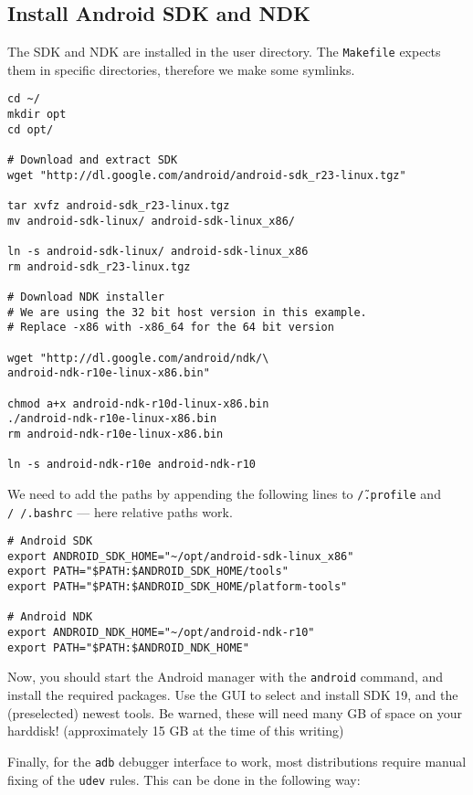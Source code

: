 \subsection{Install Android SDK and NDK}

The SDK and NDK are installed in the user directory. The \texttt{Makefile} expects them in specific directories, therefore we make some symlinks.

\begin{verbatim}
cd ~/
mkdir opt
cd opt/

# Download and extract SDK
wget "http://dl.google.com/android/android-sdk_r23-linux.tgz"

tar xvfz android-sdk_r23-linux.tgz
mv android-sdk-linux/ android-sdk-linux_x86/

ln -s android-sdk-linux/ android-sdk-linux_x86
rm android-sdk_r23-linux.tgz

# Download NDK installer
# We are using the 32 bit host version in this example.
# Replace -x86 with -x86_64 for the 64 bit version

wget "http://dl.google.com/android/ndk/\
android-ndk-r10e-linux-x86.bin"

chmod a+x android-ndk-r10d-linux-x86.bin
./android-ndk-r10e-linux-x86.bin
rm android-ndk-r10e-linux-x86.bin

ln -s android-ndk-r10e android-ndk-r10
\end{verbatim}

We need to add the paths by appending the following lines to \texttt{\~/.profile} and \texttt{/~/.bashrc} --- here relative paths work.

\begin{verbatim}
# Android SDK
export ANDROID_SDK_HOME="~/opt/android-sdk-linux_x86"
export PATH="$PATH:$ANDROID_SDK_HOME/tools"
export PATH="$PATH:$ANDROID_SDK_HOME/platform-tools"

# Android NDK
export ANDROID_NDK_HOME="~/opt/android-ndk-r10"
export PATH="$PATH:$ANDROID_NDK_HOME"
\end{verbatim}

Now, you should start the Android manager with the \texttt{android} command, and install the required packages. Use the GUI to select and install SDK 19, and the (preselected) newest tools. Be warned, these will need many GB of space on your harddisk! (approximately 15 GB at the time of this writing)

Finally, for the \texttt{adb} debugger interface to work, most distributions require manual fixing of the \texttt{udev} rules. This can be done in the following way:

